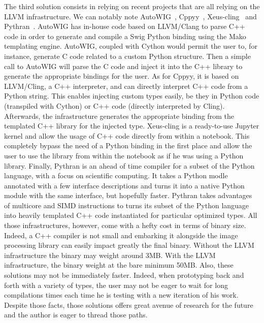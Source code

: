 The third solution consists in relying on recent projects that are all relying on the LLVM infrastructure. We can
notably note AutoWIG~\parencite{fernique.2018.autowig}, Cppyy~\parencite{wimtlplavrijsen.2016.cppyy},
Xeus-cling~\parencite{quantstack.2021.xeus-cling} and Pythran~\parencite{guelton.2015.pythran}. AutoWIG has in-house
code based on LLVM/Clang to parse C++ code in order to generate and compile a Swig Python binding using the Mako
templating engine. AutoWIG, coupled with Cython would permit the user to, for instance, generate C code related to a
custom Python structure. Then a simple call to AutoWIG will parse the C code and inject it into the C++ library to
generate the appropriate bindings for the user. As for Cppyy, it is based on LLVM/Cling, a C++ interpreter, and can
directly interpret C++ code from a Python string. This enables injecting custom types easily, be they in Python code
(transpiled with Cython) or C++ code (directly interpreted by Cling). Afterwards, the infrastructure generates the
appropriate binding from the templated C++ library for the injected type. Xeus-cling is a ready-to-use Jupyter kernel
and allow the usage of C++ code directly from within a notebook. This completely bypass the need of a Python binding in
the first place and allow the user to use the library from within the notebook as if he was using a Python library.
Finally, Pythran is an ahead of time compiler for a subset of the Python language, with a focus on scientific computing.
It takes a Python modle annotated with a few interface descriptions and turns it into a native Python module with the
same interface, but hopefully faster. Pythran takes advantages of multicore and SIMD instructions to turns its subset of
the Python language into heavily templated C++ code instantiated for particular optimized types. All those
infrastructures, however, come with a hefty cost in terms of binary size. Indeed, a C++ compiler is not small and
embarking it alongside the image processing library can easily impact greatly the final binary. Without the LLVM
infrastructure the binary may weight around 3MB. With the LLVM infrastructure, the binary weight at the bare minimum
50MB. Also, these solutions may not be immediately faster. Indeed, when prototyping back and forth with a variety of
types, the user may not be eager to wait for long compilations times each time he is testing with a new iteration of his
work. Despite those facts, those solutions offers great avenue of research for the future and the author is eager to
thread those paths.


